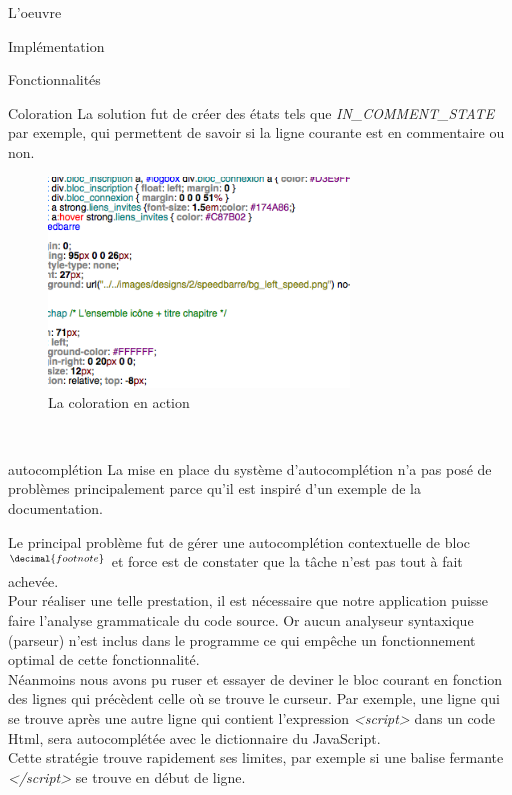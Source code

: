 \documentclass[a4paper, 12pt]{report}
\begin{document}
\begin{part}{L'oeuvre}
\begin{chapter}{Implémentation}
\begin{section}{Fonctionnalités}
\begin{subsection}{Coloration}
					La solution fut de créer des états tels que \emph{IN\_COMMENT\_STATE} par exemple, qui permettent de savoir si la ligne courante
					est en commentaire ou non.
					\begin{figure}[h]
						\begin{center}
							\includegraphics[width=8cm]{images/screenColoration.png}
							\caption{La coloration en action}
						\end{center}
					\end{figure}~\\					
				\end{subsection}
				\begin{subsection}{\Gls{autocomplétion}}
				\label{autocompl}
					La mise en place du système d'autocomplétion n'a pas posé de problèmes principalement parce qu'il est inspiré d'un exemple de
					la documentation.\\

					\addtocounter{footnote}{3}
					\footnotetext[\value{footnote}]{le bloc désigne un morceau de code inclus dans un autre morceau de code.}
					Le principal problème fut de gérer une \gls{autocomplétion} contextuelle de bloc$^{\decimal{footnote}}$
					et force est de constater que la tâche n'est pas tout à fait achevée.\\
					Pour réaliser une telle prestation, il est nécessaire que notre application puisse faire l'analyse
					grammaticale du code source. Or aucun analyseur syntaxique (\gls{parseur}) n'est inclus dans le programme ce qui empêche
					un fonctionnement optimal de cette fonctionnalité.\\


					Néanmoins nous avons pu ruser et essayer de deviner le bloc courant en fonction des lignes qui précèdent celle où se
					trouve le curseur. Par exemple, une ligne qui se trouve après une autre ligne qui contient l'expression \emph{<script>}
					dans un code \gls{Html}, sera autocomplétée avec le dictionnaire du \gls{JavaScript}.\\
					Cette stratégie trouve rapidement ses limites, par exemple si une balise fermante \emph{</script>} se trouve en début
					de ligne.\\



\end{subsection}
\end{section}
\end{chapter}
\end{part}
\end{document}
